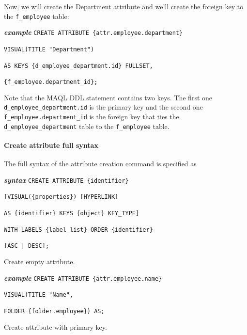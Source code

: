 \documentclass[a4paper, 12pt, titlepage, fleqn]{article}
\begin{document}
Now, we will create the Department attribute and we'll create the foreign key to the \verb=f_employee= table:

\textbf{\emph{example}}  \hspace{.9cm}\verb=CREATE ATTRIBUTE {attr.employee.department}=

\hspace{2.5cm}\verb=VISUAL(TITLE "Department")= 

\hspace{2.5cm}\verb=AS KEYS {d_employee_department.id} FULLSET,=

\hspace{2.5cm}\verb={f_employee.department_id};=

\noindent Note that the MAQL DDL statement contains two keys. The first one \verb=d_employee_department.id= is the primary key and the second one \verb=f_employee.department_id= is the foreign key that ties the \verb=d_employee_department= table to the \verb=f_employee= table.

\paragraph*{Create attribute full syntax} The full syntax of the attribute creation command is specified as

\textbf{\emph{syntax}}  \hspace{.9cm}\verb=CREATE ATTRIBUTE {identifier}=

\hspace{2.2cm}\verb=[VISUAL({properties}) [HYPERLINK]=

\hspace{2.2cm}\verb=AS {identifier} KEYS {object} KEY_TYPE]=

\hspace{2.2cm}\verb=WITH LABELS {label_list} ORDER {identifier}=

\hspace{2.2cm}\verb=[ASC | DESC];=

\noindent Create empty attribute.

\textbf{\emph{example}}  \hspace{.9cm}\verb=CREATE ATTRIBUTE {attr.employee.name}=

\hspace{2.5cm}\verb=VISUAL(TITLE "Name",=

\hspace{2.5cm}\verb=FOLDER {folder.employee}) AS;=

\noindent Create attribute with primary key.
\end{document}
